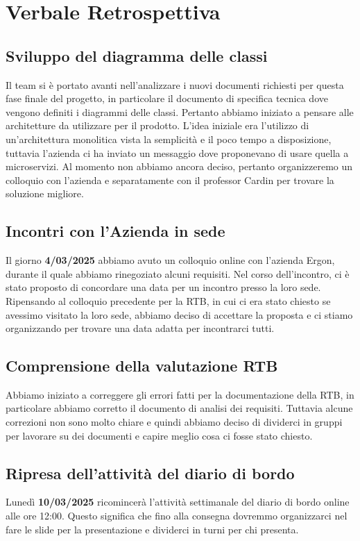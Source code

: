 \documentclass{article}
\begin{document}
\newpage
\section{Verbale Retrospettiva}
\subsection{Sviluppo del diagramma delle classi}
Il team si è portato avanti nell'analizzare i nuovi documenti richiesti per questa fase finale del progetto, in particolare il documento di specifica tecnica dove vengono definiti i diagrammi delle classi. Pertanto abbiamo
iniziato a pensare alle architetture da utilizzare per il prodotto. L'idea iniziale era l'utilizzo di un'architettura monolitica vista la semplicità e il poco tempo a disposizione, tuttavia l'azienda ci ha inviato
un messaggio dove proponevano di usare quella a microservizi. Al momento non abbiamo ancora deciso, pertanto organizzeremo un colloquio con l'azienda e separatamente con il professor Cardin per trovare la soluzione migliore.
\subsection{Incontri con l'Azienda in sede}
Il giorno \textbf{4/03/2025} abbiamo avuto un colloquio online con l'azienda Ergon, durante il quale abbiamo rinegoziato alcuni requisiti. Nel corso dell'incontro, ci è stato proposto di concordare una data per un incontro presso la loro sede. Ripensando al colloquio precedente per la RTB, in cui ci era stato chiesto se avessimo visitato la loro sede, abbiamo deciso di accettare la proposta e ci stiamo organizzando per trovare una data adatta per incontrarci tutti.
\subsection{Comprensione della valutazione RTB}
Abbiamo iniziato a correggere gli errori fatti per la documentazione della RTB, in particolare abbiamo corretto il documento di analisi dei requisiti. Tuttavia alcune correzioni non sono molto chiare e quindi abbiamo deciso di dividerci in gruppi per lavorare su dei documenti e capire meglio cosa ci fosse stato chiesto.
\subsection{Ripresa dell'attività del diario di bordo}
Lunedì \textbf{10/03/2025} ricomincerà l'attività settimanale del diario di bordo online alle ore 12:00. Questo significa che fino alla consegna dovremmo organizzarci nel fare le slide per la presentazione e dividerci in turni per chi presenta.
\end{document}

